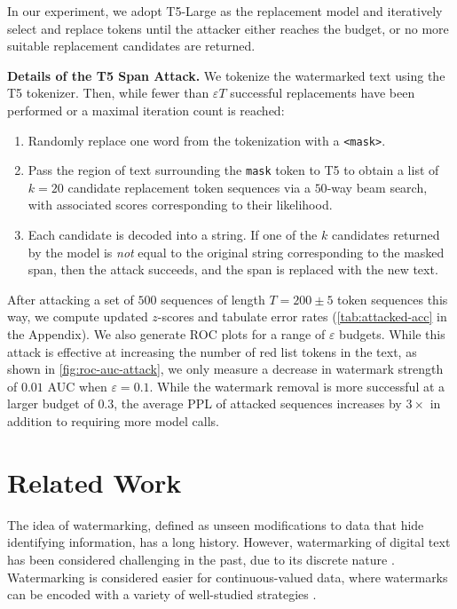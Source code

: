 \documentclass{article}
\theoremstyle{plain}
\theoremstyle{definition}
\theoremstyle{remark}
\begin{document}
In our experiment, we adopt T5-Large \citep{raffel_exploring_2020} as the replacement model and iteratively select and replace tokens until the attacker either reaches the budget, or no more suitable replacement candidates are returned. 

\textbf{Details of the T5 Span Attack.}
We tokenize the watermarked text using the T5 tokenizer. Then, while fewer than $\varepsilon T$ successful replacements have been performed or a maximal iteration count is reached:
\begin{enumerate}[topsep=0pt,itemsep=-0ex,partopsep=1ex,parsep=1ex]
\item Randomly replace one word from the tokenization with a \texttt{<mask>}.
\item Pass the region of text surrounding the \texttt{mask} token to T5 to obtain a list of $k=20$ candidate replacement token sequences via a $50$-way beam search, with associated scores corresponding to their likelihood.
\item Each candidate is decoded into a string. If one of the $k$ candidates returned by the model is \emph{not} equal to the original string corresponding to the masked span, then the attack succeeds, and the span is replaced with the new text.
\end{enumerate}

After attacking a set of $500$ sequences of length $T=200\pm5$ token sequences this way, we compute updated $z$-scores and tabulate error rates (\cref{tab:attacked-acc} in the Appendix). We also generate ROC plots for a range of $\varepsilon$ budgets. While this attack is effective at increasing the number of red list tokens in the text, as shown in \cref{fig:roc-auc-attack}, we only measure a decrease in watermark strength of $0.01$ AUC when $\varepsilon=0.1$. While the watermark removal is more successful at a larger budget of $0.3$, the average PPL of attacked sequences increases by $3\times$ in addition to requiring more model calls.

\section{Related Work} 

 The idea of watermarking, defined as unseen modifications to data that hide identifying information, has a long history. 
However, watermarking of digital text has been considered challenging in the past, due to its discrete nature \citep{katzenbeisser_information_2000}. Watermarking is considered easier for continuous-valued data, where watermarks can be encoded with a variety of well-studied strategies  \citep{petitcolas_information_1999,zhu_hidden_2018,lu_large-capacity_2021,boenisch_systematic_2021}.
\end{document}
